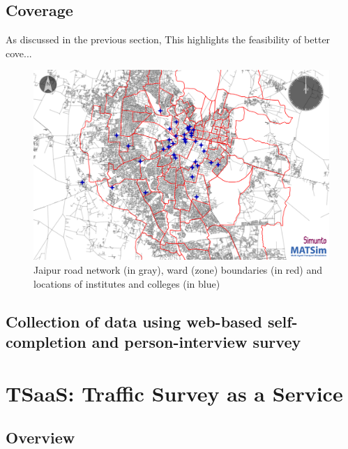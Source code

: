\documentclass[12pt,authoryear]{elsarticle}
\begin{document}
\subsection{Coverage}
%
As discussed in the previous section,
%
This highlights the feasibility of better cove...
\begin{figure}[!ht]
	\centering
	\includegraphics[trim=100 70 230 40, clip, width=0.7\linewidth]{insti_colleges_jaipur}
	\caption{Jaipur road network (in gray), ward (zone) boundaries (in red) and locations of institutes and colleges (in blue)}
	\label{fig:insticollegesjaipur}
\end{figure}

\subsection{Collection of data using web-based self-completion and person-interview survey}


%
%
\section{TSaaS: Traffic Survey as a Service}
\label{sec:results}
%
\subsection{Overview}
\end{document}
